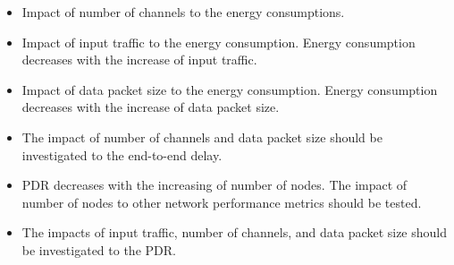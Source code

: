 \documentclass{article}
\begin{document}
\begin{itemize}
  \item Impact of number of channels to the energy consumptions.
  \item Impact of input traffic to the energy consumption. Energy consumption decreases with the increase of input traffic.
  \item Impact of data packet size to the energy consumption. Energy consumption decreases with the increase of data packet size.
  \item The impact of number of channels and data packet size should be investigated to the end-to-end delay.
  \item PDR decreases with the increasing of number of nodes. The impact of number of nodes to other network performance metrics should be tested. 
  \item The impacts of input traffic, number of channels, and data packet size should be investigated to the PDR.
\end{itemize} 

\clearpage
\nocite{*}


\end{document}
